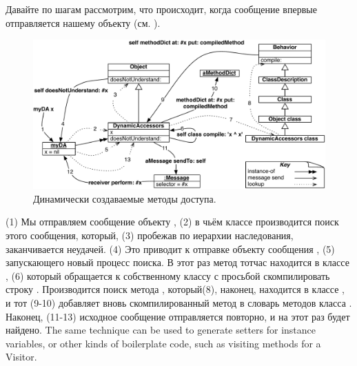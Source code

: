 \documentclass[a4paper,10pt,twoside]{book}
\begin{document}
Давайте по шагам рассмотрим, что происходит, когда сообщение  впервые отправляется нашему объекту (см. ).

\begin{figure}[ht]\centering
	\includegraphics[width=\linewidth]{DynamicAccessors}
	\caption{Динамически создаваемые методы доступа.\figlabel{DynamicAccessors}}
\end{figure}

(1) Мы отправляем сообщение  объекту , (2) в чьём классе производится поиск этого сообщения, который, (3) пробежав по иерархии наследования, заканчивается неудачей. (4) Это приводит к отправке объекту сообщения , (5) запускающего новый процесс поиска. В этот раз метод  тотчас находится в классе , (6) который обращается к собственному классу с просьбой скомпилировать строку . Производится поиск метода , который(8), наконец, находится в классе , и тот (9-10) добавляет вновь скомпилированный метод в словарь методов класса . Наконец, (11-13) исходное сообщение отправляется повторно, и на этот раз будет найдено.
The same technique can be used to generate setters for instance variables, or other kinds of boilerplate code, such as visiting methods for a Visitor.
\end{document}
